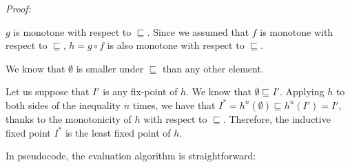 \emph{Proof:} 

$g$ is monotone with respect to $\sqsubseteq$. Since we assumed that $f$ is monotone with respect to $\sqsubseteq$, $h = g \circ f$ is also monotone with respect to $\sqsubseteq$. 

We know that $\emptyset$ is smaller under $\sqsubseteq$ than any other element.

Let us suppose that $I'$ is any fix-point of $h$.  We know that $\emptyset \sqsubseteq I'$. Applying $h$ to both sides of the inequality $n$ times, we have that $I^* = h^n(\emptyset) \sqsubseteq h^n(I') = I'$, thanks to the monotonicity of $h$ with respect to $\sqsubseteq$. Therefore, the inductive fixed point $I^*$ is the least fixed point of $h$.

In pseudocode, the evaluation algorithm is straightforward:

\begin{figure}[h!]
\end{figure}





